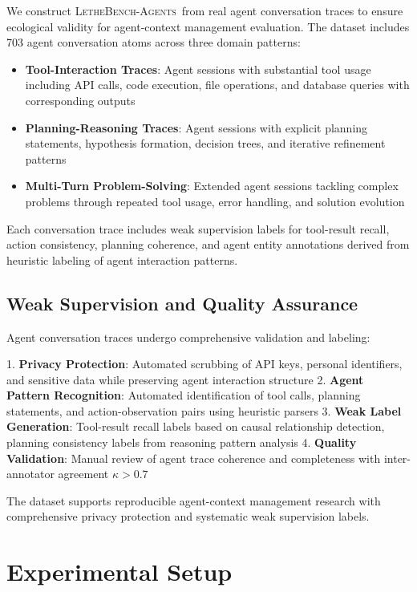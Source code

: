 \documentclass[letterpaper]{article}
\newcommand{\lethebench}{\textsc{LetheBench-Agents}}
\begin{document}
We construct \lethebench\ from real agent conversation traces to ensure ecological validity for agent-context management evaluation. The dataset includes 703 agent conversation atoms across three domain patterns:

\begin{itemize}
    \item \textbf{Tool-Interaction Traces}: Agent sessions with substantial tool usage including API calls, code execution, file operations, and database queries with corresponding outputs
    \item \textbf{Planning-Reasoning Traces}: Agent sessions with explicit planning statements, hypothesis formation, decision trees, and iterative refinement patterns
    \item \textbf{Multi-Turn Problem-Solving}: Extended agent sessions tackling complex problems through repeated tool usage, error handling, and solution evolution
\end{itemize}

Each conversation trace includes weak supervision labels for tool-result recall, action consistency, planning coherence, and agent entity annotations derived from heuristic labeling of agent interaction patterns.

\subsection{Weak Supervision and Quality Assurance}

Agent conversation traces undergo comprehensive validation and labeling:

1. \textbf{Privacy Protection}: Automated scrubbing of API keys, personal identifiers, and sensitive data while preserving agent interaction structure
2. \textbf{Agent Pattern Recognition}: Automated identification of tool calls, planning statements, and action-observation pairs using heuristic parsers
3. \textbf{Weak Label Generation}: Tool-result recall labels based on causal relationship detection, planning consistency labels from reasoning pattern analysis
4. \textbf{Quality Validation}: Manual review of agent trace coherence and completeness with inter-annotator agreement $\kappa > 0.7$

The dataset supports reproducible agent-context management research with comprehensive privacy protection and systematic weak supervision labels.

\section{Experimental Setup}
\end{document}
